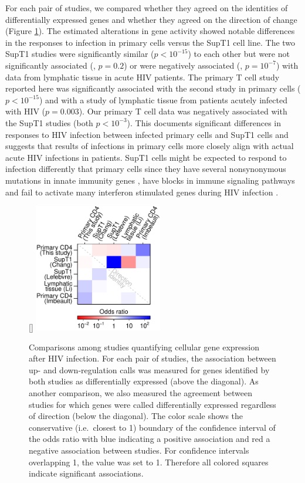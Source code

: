 \documentclass[../sherrill-Mix_thesis.tex]{subfiles}
\begin{document}
			For each pair of studies, we compared whether they agreed on the identities of differentially expressed genes and whether they agreed on the direction of change (Figure \ref{figGenes}). The estimated alterations in gene activity showed notable differences in the responses to infection in primary cells versus the SupT1 cell line. The two SupT1 studies were significantly similar ($p<10^{-15}$) to each other but were not significantly associated (\citet{Lefebvre2011}, $p=0.2$) or were negatively associated (\citet{Chang2011}, $p=10^{-7}$) with data from lymphatic tissue in acute HIV patients. The primary T cell study reported here was significantly associated with the second study in primary cells ($p<10^{-15}$) and with a study of lymphatic tissue from patients acutely infected with HIV ($p=0.003$).  Our primary T cell data was negatively associated with the SupT1 studies (both $p<10^{-3}$). This documents significant differences in responses to HIV infection between infected primary cells and SupT1 cells and suggests that results of infections in primary cells more closely align with actual acute HIV infections in patients.  SupT1 cells might be expected to respond to infection differently that primary cells since they have several nonsynonymous mutations in innate immunity genes \citep{KalenderAtak2012}, have blocks in immune signaling pathways \citep{Patel2012} and fail to activate many interferon stimulated genes during HIV infection \citep{Mohammadi2013}. 
	
		\begin{figure}
			\centering
				[\FBwidth]{
					\includegraphics[width=0.5\textwidth]{compare.pdf}
				}{
					\caption[Comparisons among studies quantifying cellular gene expression after HIV infection]{Comparisons among studies quantifying cellular gene expression after HIV infection. For each pair of studies, the association between up- and down-regulation calls was measured for genes identified by both studies as differentially expressed (above the diagonal).  As another comparison, we also measured the agreement between studies for which genes were called differentially expressed regardless of direction (below the diagonal). The color scale shows the conservative (i.e.\  closest to 1) boundary of the confidence interval of the odds ratio with blue indicating a positive association and red a negative association between studies. For confidence intervals overlapping 1, the value was set to 1. Therefore all colored squares indicate significant associations.}	\label{figGenes}
				}
		\end{figure}
\end{document}

